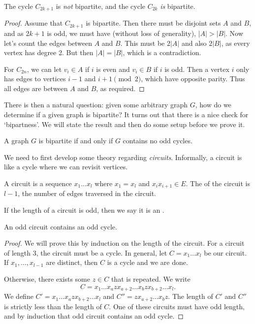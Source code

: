 \begin{proposition}
	The cycle $C_{2k + 1}$ is \emph{not} bipartite, and the cycle $C_{2k}$ \emph{is} bipartite.
\end{proposition}
\begin{proof}
	Assume that $C_{2k + 1}$ is bipartite. Then there must be disjoint sets $A$ and $B$, and as $2k + 1$ is odd, we must have (without loss of generality), $|A| > |B|$. Now let's count the edges between $A$ and $B$. This must be $2|A|$ and also $2|B|$, as every vertex has degree 2. But then $|A| = |B|$, which is a contradiction.

	For $C_{2n}$, we can let $v_i \in A$ if $i$ is even and $v_i \in B$ if $i$ is odd. Then a vertex $i$ only has edges to vertices $i - 1$ and $i + 1 \pmod{2}$, which have opposite parity. Thus all edges are between $A$ and $B$, as required.
\end{proof}

There is then a natural question: given some arbitrary graph $G$, how do we determine if a given graph is bipartite? It turns out that there is a nice check for `bipartness'. We will state the result and then do some setup before we prove it. 

\begin{proposition}
	A graph $G$ is bipartite if and only if $G$ contains no odd cycles.
\end{proposition}

We need to first develop some theory regarding \emph{circuits}.
Informally, a circuit is like a cycle where we can revisit vertices.


\begin{definition}[Circuit]
A circuit is a sequence $x_1 \dots x_l$ where $x_1 = x_l$ and $x_i x_{i + 1} \in E$. The  of the circuit is $l - 1$, the number of edges traversed in the circuit.
\end{definition}

\begin{definition}
	If the length of a circuit is odd, then we say it is an .
\end{definition}

\begin{proposition}
An odd circuit contains an odd cycle.	
\end{proposition}
\begin{proof}
	We will prove this by induction on the length of the circuit. For a circuit of length $3$, the circuit must be a cycle.
	In general, let $C = x_1 \dots x_l$ be our circuit. If $x_1, \dots, x_{l - 1}$ are distinct, then $C$ is a cycle and we are done. 
	
	Otherwise, there exists some $z \in C$ that is repeated. We write 
	$$C = x_1 \dots x_a z x_{a + 2} \dots x_{b} z x_{b + 2} \dots x_l.$$
	We define $C' = x_1 \dots x_a z x_{b + 2} \dots x_l$ and $C'' = z x_{a + 2} \dots x_b z$. The length of $C'$ and $C''$ is strictly less than the length of $C$. One of these circuits must have odd length, and by induction that odd circuit contains an odd cycle.
\end{proof}

